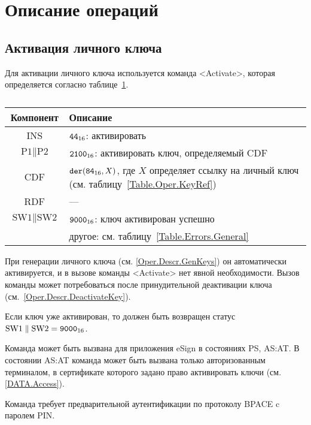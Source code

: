 \section{Описание операций}\label{Oper.Descr}

\subsection{Активация личного ключа}\label{Oper.Descr.ActivateKey}

Для активации личного ключа используется команда <Activate>,
которая определяется согласно таблице~\ref{Table.Oper.ActivateCmd}.

\begin{table}[hbt]
\caption{}\label{Table.Oper.ActivateCmd}
\begin{tabular}{|c|p{14cm}|}
\hline
Компонент & Описание\\
\hline
\hline
INS & $\texttt{44}_{16}$: активировать\\
\hline
$\text{P1} \parallel \text{P2}$ & $\texttt{2100}_{16}$: 
активировать ключ, определяемый CDF\\
\hline
CDF &  $\texttt{der}(\texttt{84}_{16}, X)$,   
где $X$ определяет ссылку на личный ключ 
(см. таблицу~\ref{Table.Oper.KeyRef}) \\ 
\hline
RDF &  --- \\
\hline
$\text{SW1} \parallel \text{SW2}$ & $\texttt{9000}_{16}$: ключ активирован успешно \\
  & другое: см. таблицу~\ref{Table.Errors.General} \\
\hline
\end{tabular}
\end{table}


При генерации личного ключа (см. \ref{Oper.Descr.GenKeys})
он автоматически активируется, 
и в вызове команды <Activate> нет явной необходимости. 
Вызов команды может потребоваться после 
принудительной деактивации ключа (см.~\ref{Oper.Descr.DeactivateKey}).  

Если ключ уже активирован, то должен быть 
возвращен статус $\text{SW1} \parallel \text{SW2} = \texttt{9000}_{16}$.

Команда может быть вызвана для приложения eSign в состояниях PS, AS:AT.
В состоянии AS:AT команда может быть вызвана только
авторизованным терминалом, в сертификате которого задано право
активировать ключи (см. \ref{DATA.Access}).

Команда требует предварительной аутентификации 
по протоколу BPACE c паролем PIN.

